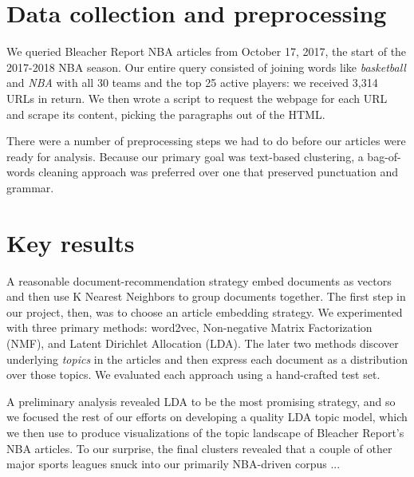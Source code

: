 \documentclass{article}
\begin{document}
\section{Data collection and preprocessing}


We queried Bleacher Report NBA
articles from October 17, 2017, the start of the 2017-2018 NBA season. Our entire query consisted of
joining words like \emph{basketball} and \emph{NBA} with all 30 teams and the top 25 active players:
we received 3,314 URLs in return.  We then wrote a script to request the webpage for each URL and scrape its content, picking the paragraphs out of the HTML.

There were a number of preprocessing steps we had to do before our articles were ready for analysis. Because our primary goal was text-based clustering, a bag-of-words cleaning approach was preferred 
over one that preserved punctuation and grammar.

\section{Key results}
A reasonable document-recommendation strategy embed documents as vectors and then use K Nearest Neighbors to group documents together.  The first step in our project, then, was to choose an article embedding strategy.  We experimented with three primary methods: word2vec, Non-negative Matrix Factorization (NMF), and Latent Dirichlet Allocation (LDA). The later two methods discover underlying \textit{topics} in the articles and then express each document as a distribution over those topics.  We evaluated each approach using a hand-crafted test set. 

A preliminary analysis revealed LDA to be the most promising strategy, and so we focused the rest of our efforts on developing a quality LDA topic model, which we then use to produce visualizations of the topic landscape of Bleacher Report's NBA articles. To our surprise, the final clusters revealed that a couple of other major sports leagues snuck into our primarily NBA-driven corpus ...
\end{document}
